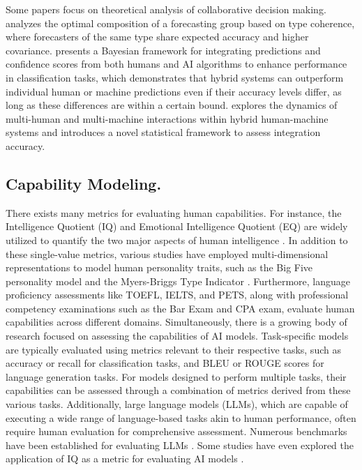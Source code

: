 Some papers focus on theoretical analysis of collaborative decision making. \citet{lamberson2012optimal} analyzes the optimal composition of a forecasting group based on type coherence, where forecasters of the same type share expected accuracy and higher covariance. \citet{steyvers2022bayesian} presents a Bayesian framework for integrating predictions and confidence scores from both humans and AI algorithms to enhance performance in classification tasks, which demonstrates that hybrid systems can outperform individual human or machine predictions even if their accuracy levels differ, as long as these differences are within a certain bound. \citet{zou2024} explores the dynamics of multi-human and multi-machine interactions within hybrid human-machine systems and introduces a novel statistical framework to assess integration accuracy. 

\subsection{Capability Modeling.}

There exists many metrics for evaluating human capabilities. 
For instance, the Intelligence Quotient (IQ) and Emotional Intelligence Quotient (EQ) are widely utilized to quantify the two major aspects of human intelligence \citep{1945The, Mayer2001Emotional}. In addition to these single-value metrics, various studies have employed multi-dimensional representations to model human personality traits, such as the Big Five personality model and the Myers-Briggs Type Indicator \citep{Goldberg1990An, pittenger1993measuring, Myers1999MBTI}. 
Furthermore, language proficiency assessments like TOEFL, IELTS, and PETS, along with professional competency examinations such as the Bar Exam and CPA exam, evaluate human capabilities across different domains. Simultaneously, there is a growing body of research focused on assessing the capabilities of AI models. Task-specific models are typically evaluated using metrics relevant to their respective tasks, such as accuracy or recall for classification tasks, and BLEU or ROUGE scores for language generation tasks. For models designed to perform multiple tasks, their capabilities can be assessed through a combination of metrics derived from these various tasks.
Additionally, large language models (LLMs), which are capable of executing a wide range of language-based tasks akin to human performance, often require human evaluation for comprehensive assessment. Numerous benchmarks have been established for evaluating LLMs \citep{Chang2023A}. Some studies have even explored the application of IQ as a metric for evaluating AI models \citep{Liu2019How, Holzinger2019KANDINSKY, Kim2021Exploring}. 

